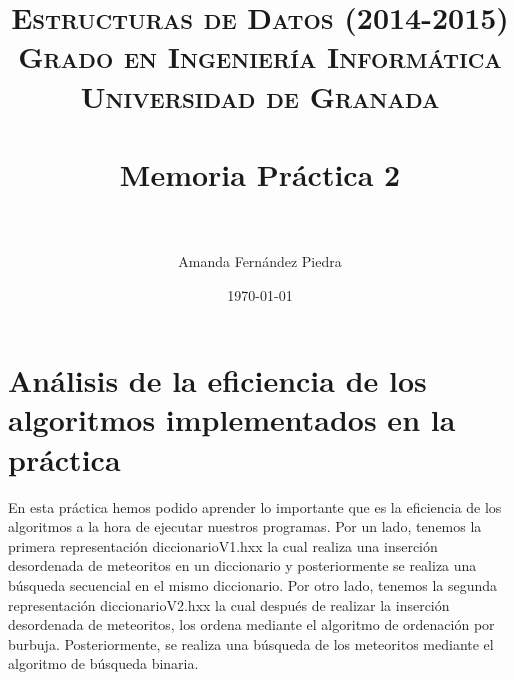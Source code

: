


\title{	
\normalfont \normalsize 
\textsc{{\bf Estructuras de Datos (2014-2015)} \\ Grado en Ingeniería Informática \\ Universidad de Granada} \\ [25pt] %
\horrule{0.5pt} \\[0.4cm] %
\huge Memoria Práctica 2 \\ %
\horrule{2pt} \\[0.5cm] %
}
\usepackage[spanish]{babel}
\author{Amanda Fernández Piedra} %
\usepackage[utf8]{inputenc}
\date{\normalsize\today} %




\maketitle %

\newpage %

\tableofcontents %

\listoffigures


\newpage

\newpage


\section{Análisis de la eficiencia de los algoritmos implementados en la práctica}
En esta práctica hemos podido aprender lo importante que es la eficiencia de los 
algoritmos a la hora de ejecutar nuestros programas. 
Por un lado, tenemos la primera representación diccionarioV1.hxx la cual realiza 
una inserción desordenada de meteoritos en un diccionario y posteriormente se 
realiza una búsqueda secuencial en el mismo diccionario.
Por otro lado, tenemos la segunda representación diccionarioV2.hxx la cual 
después de realizar la inserción desordenada de meteoritos, los ordena mediante 
el algoritmo de ordenación por burbuja. Posteriormente, se realiza una búsqueda 
de los meteoritos mediante el algoritmo de búsqueda binaria.

